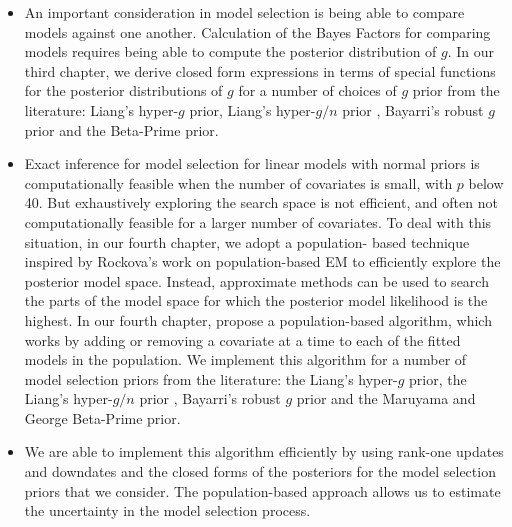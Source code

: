 \begin{itemize}



\item An important consideration in model selection is being able to compare models against one another.
Calculation of the Bayes Factors for comparing models requires being able to compute the posterior
distribution of $g$. In our third chapter, we derive closed form expressions in terms of special functions for
the posterior distributions of $g$ for a number of choices of $g$ prior from the literature: Liang's hyper-$g$
prior, Liang's hyper-$g/n$ prior \citep{Liang2008}, Bayarri's robust $g$ prior \citep{Bayarri2012} and the
Beta-Prime \citep{Maruyama2011} prior.


\item Exact inference for model selection for linear models with normal priors is computationally feasible
when the number of  covariates is small, with $p$ below 40. But exhaustively exploring the search space is not
efficient, and often not computationally feasible for a larger number of covariates. To deal with this
situation, in our fourth chapter, we adopt a population- based technique inspired by Rockova's work on
population-based EM to efficiently explore the posterior model space. Instead, approximate methods can be used
to search the parts of the model space for which the posterior model likelihood is the highest. In our fourth
chapter, propose a population-based algorithm, which works by adding or removing a covariate at a time to each
of the fitted models in the population. We implement this algorithm for a number of model selection priors
from the literature: the Liang's hyper-$g$ prior, the Liang's hyper-$g/n$ prior \citep{Liang2008}, Bayarri's
robust $g$ prior \citep{Bayarri2012} and the  Maruyama and George Beta-Prime \citep{Maruyama2011} prior.


\item We are able to implement this algorithm efficiently by using rank-one updates and downdates and the closed
forms of the posteriors for the model selection priors that we consider. The population-based approach allows
us to estimate the uncertainty in the model selection process.

\end{itemize}
